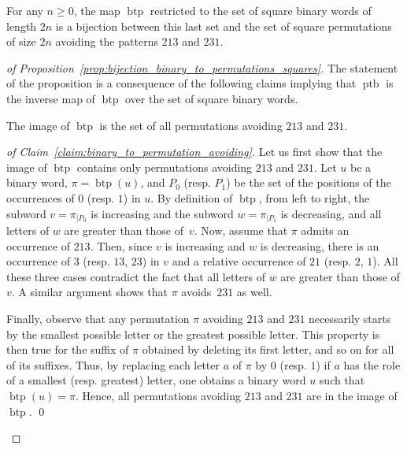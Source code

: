 \documentclass[a4paper]{llncs}
\DeclareMathOperator{\BINTOPERM}{\mathrm{btp}}
\DeclareMathOperator{\PERMTOBIN}{\mathrm{ptb}}
\begin{document}
\begin{proposition} \label{prop:bijection_binary_to_permutations_squares}
    For any $n \geq 0$, the map $\BINTOPERM$ restricted to the set of
    square binary words of length $2n$ is a bijection between this last
    set and the set of square permutations of size $2n$ avoiding the
    patterns $213$ and $231$.
\end{proposition}
\begin{proof}
    [of Proposition~\ref{prop:bijection_binary_to_permutations_squares}]
    The statement of the proposition is a consequence of the
    following claims implying that $\PERMTOBIN$ is the inverse
    map of $\BINTOPERM$ over the set of square binary words.
    \begin{claim} \label{claim:binary_to_permutation_avoiding}
        The image of $\BINTOPERM$ is the set of all permutations
        avoiding $213$ and $231$.
    \end{claim}
    \begin{proof}[of Claim~\ref{claim:binary_to_permutation_avoiding}]
        Let us first show that the image of $\BINTOPERM$ contains only
        permutations avoiding $213$ and $231$. Let $u$ be a binary word,
        $\pi = \BINTOPERM(u)$, and $P_0$ (resp. $P_1$) be the set of the
        positions of the occurrences of $0$ (resp. $1$) in $u$. By
        definition of $\BINTOPERM$, from left to right, the subword
        $v = \pi_{|P_0}$ is increasing and the subword $w = \pi_{|P_1}$
        is decreasing, and all letters of $w$ are greater than those
        of~$v$. Now, assume that $\pi$ admits an occurrence of $213$.
        Then, since $v$ is increasing and $w$ is decreasing, there is an
        occurrence of $3$ (resp. $13$, $23$) in $v$ and a relative
        occurrence of $21$ (resp. $2$, $1$). All these three cases
        contradict the fact that all letters of $w$ are greater than
        those of $v$. A similar argument shows that $\pi$ avoids~$231$
        as well.
        \smallskip

        Finally, observe that any permutation $\pi$ avoiding $213$ and
        $231$ necessarily starts by the smallest possible letter or the
        greatest possible letter. This property is then true for the
        suffix of $\pi$ obtained by deleting its first letter,
        and so on for all of its suffixes. Thus, by
        replacing each letter $a$ of $\pi$ by $0$ (resp. $1$) if $a$ has the
        role of a smallest (resp. greatest) letter, one obtains a binary
        word $u$ such that $\BINTOPERM(u) = \pi$. Hence, all permutations
        avoiding $213$ and $231$ are in the image of $\BINTOPERM$.
        \qed
    \end{proof}


\end{proof}
\end{document}
